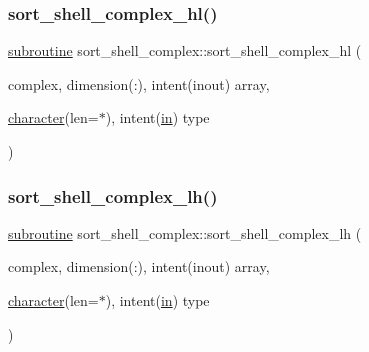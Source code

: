 \mbox{\label{M__sort_8f90_a6fafc1b948c7b07b66615208dd7fbc23}} 
\subsubsection{\texorpdfstring{sort\+\_\+shell\+\_\+complex\+\_\+hl()}{sort\_shell\_complex\_hl()}}
{\footnotesize\ttfamily \hyperlink{M__stopwatch_83_8txt_acfbcff50169d691ff02d4a123ed70482}{subroutine} sort\+\_\+shell\+\_\+complex\+::sort\+\_\+shell\+\_\+complex\+\_\+hl (\begin{DoxyParamCaption}\item[{complex, dimension(\+:), intent(inout)}]{array,  }\item[{\hyperlink{option__stopwatch_83_8txt_abd4b21fbbd175834027b5224bfe97e66}{character}(len=$\ast$), intent(\hyperlink{M__journal_83_8txt_afce72651d1eed785a2132bee863b2f38}{in})}]{type }\end{DoxyParamCaption})\hspace{0.3cm}{\ttfamily [private]}}

\mbox{\label{M__sort_8f90_a5c16be512f55ef72b6777c149821ffa8}} 
\subsubsection{\texorpdfstring{sort\+\_\+shell\+\_\+complex\+\_\+lh()}{sort\_shell\_complex\_lh()}}
{\footnotesize\ttfamily \hyperlink{M__stopwatch_83_8txt_acfbcff50169d691ff02d4a123ed70482}{subroutine} sort\+\_\+shell\+\_\+complex\+::sort\+\_\+shell\+\_\+complex\+\_\+lh (\begin{DoxyParamCaption}\item[{complex, dimension(\+:), intent(inout)}]{array,  }\item[{\hyperlink{option__stopwatch_83_8txt_abd4b21fbbd175834027b5224bfe97e66}{character}(len=$\ast$), intent(\hyperlink{M__journal_83_8txt_afce72651d1eed785a2132bee863b2f38}{in})}]{type }\end{DoxyParamCaption})\hspace{0.3cm}{\ttfamily [private]}}

